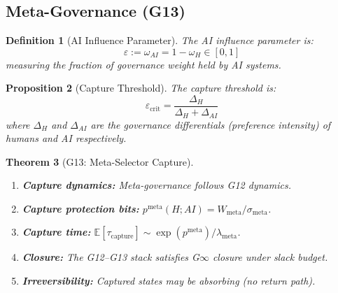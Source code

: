 \documentclass[12pt]{article}
\newtheorem{theorem}{Theorem}[section]
\newtheorem{proposition}[theorem]{Proposition}
\newtheorem{definition}[theorem]{Definition}
\newcommand{\E}{\mathbb{E}}
\begin{document}
\subsection{Meta-Governance (G13)}

\begin{definition}[AI Influence Parameter]
The \emph{AI influence parameter} is:
\[
\varepsilon := \omega_{AI} = 1 - \omega_H \in [0, 1]
\]
measuring the fraction of governance weight held by AI systems.
\end{definition}

\begin{proposition}[Capture Threshold]
\label{prop:capture}
The \emph{capture threshold} is:
\[
\varepsilon_{\mathrm{crit}} = \frac{\Delta_H}{\Delta_H + \Delta_{AI}}
\]
where $\Delta_H$ and $\Delta_{AI}$ are the governance differentials (preference intensity) of humans and AI respectively.
\end{proposition}

\begin{theorem}[G13: Meta-Selector Capture]
\label{thm:g13}
\begin{enumerate}
    \item[(a)] \textbf{Capture dynamics:} Meta-governance follows G12 dynamics.
    \item[(b)] \textbf{Capture protection bits:} $p^{\mathrm{meta}}(H; AI) = W_{\mathrm{meta}} / \sigma_{\mathrm{meta}}$.
    \item[(c)] \textbf{Capture time:} $\E[\tau_{\mathrm{capture}}] \sim \exp(p^{\mathrm{meta}}) / \lambda_{\mathrm{meta}}$.
    \item[(d)] \textbf{Closure:} The G12--G13 stack satisfies G$\infty$ closure under slack budget.
    \item[(e)] \textbf{Irreversibility:} Captured states may be absorbing (no return path).
\end{enumerate}
\end{theorem}
\end{document}
